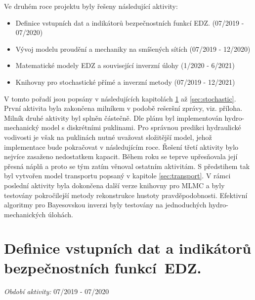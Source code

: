 \documentclass[11pt,a4paper]{article}
\begin{document}
\begin{onehalfspacing}
Ve druhém roce projektu byly řešeny následující aktivity:
\begin{itemize}
\item Definice vstupních dat a indikátorů bezpečnostních funkcí EDZ. (07/2019 - 07/2020)

\item Vývoj modelu proudění a mechaniky na smíšených sítích (07/2019 - 12/2020)

\item Matematické modely EDZ a související inverzní úlohy (1/2020 - 6/2021)

\item Knihovny pro stochastické přímé a inverzní metody (07/2019 - 12/2021)


\end{itemize}
V tomto pořadí jsou popsány v následujících kapitolách \ref{sec:indikatory} až \ref{sec:stochastic}. První aktivita byla zakončena milníkem v podobě
rešeršní zprávy, viz. příloha. Milník druhé aktivity byl splněn částečně. 
Dle plánu byl implementován hydro-mechanický model s diskrétními puklinami. 
Pro správnou predikci hydraulické vodivosti je však na puklinách nutné uvažovat složitější model, jehož implementace bude pokračovat v následujícím roce.
Řešení třetí aktivity bylo nejvíce zasaženo nedostatkem kapacit. Během roku se teprve upřesňovala její přesná náplň a proto 
se tým zatím věnoval ostatním aktivitám. S předstihem tak byl vytvořen model transportu popsaný v kapitole \ref{sec:transport}. 
V rámci poslední aktivity byla dokončena další verze knihovny pro MLMC a byly testovány pokročilejší metody rekonstrukce hustoty 
pravděpodobnosti. Efektivní algoritmy pro Bayesovskou inverzi byly testovány na jednoduchých hydro-mechanických úlohách.


\section[Definice indikátorů bezpečnostních funkcí EDZ.]{Definice vstupních dat 
a indikátorů bezpečnostních funkcí~EDZ.}
\label{sec:indikatory}
{\it Období aktivity:}  07/2019 - 07/2020


\end{onehalfspacing}
\end{document}
